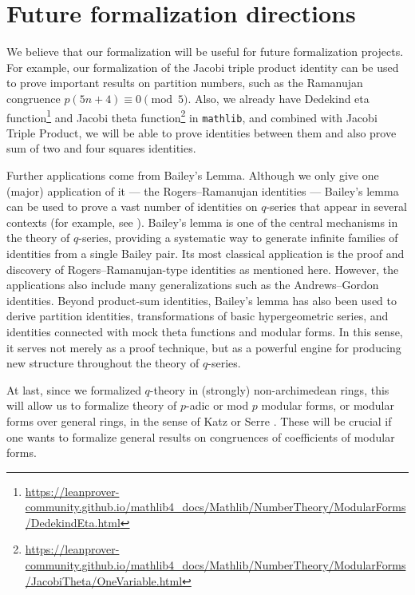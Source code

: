 \documentclass[12pt]{amsart}
\theoremstyle{definition}
\theoremstyle{remark}
\numberwithin{equation}{subsection}
\begin{document}
\section{Future formalization directions}

We believe that our formalization will be useful for future formalization projects.
For example, our formalization of the Jacobi triple product identity can be used to prove important results on partition numbers, such as the Ramanujan congruence $p(5n+4) \equiv 0 \pmod{5}$.
Also, we already have Dedekind eta function\footnote{\url{https://leanprover-community.github.io/mathlib4_docs/Mathlib/NumberTheory/ModularForms/DedekindEta.html}} and Jacobi theta function\footnote{\url{https://leanprover-community.github.io/mathlib4_docs/Mathlib/NumberTheory/ModularForms/JacobiTheta/OneVariable.html}} in \texttt{mathlib}, and combined with Jacobi Triple Product, we will be able to prove identities between them and also prove sum of two and four squares identities.

Further applications come from Bailey's Lemma. Although we only give one (major) application of it --- the Rogers--Ramanujan identities --- Bailey's lemma can be used to prove a vast number of identities on $q$-series that appear in several contexts (for example, see \cite{Andrews1974, Andrews1986, Bailey1949, Berndt, BFOR, GOW, SillsBook}). Bailey’s lemma is one of the central mechanisms in the theory of $q$-series, providing a systematic way to generate infinite families of identities from a single Bailey pair. Its most classical application is the proof and discovery of Rogers–Ramanujan-type identities as mentioned here. However, the applications also include many generalizations such as the Andrews–Gordon identities. Beyond product-sum identities, Bailey’s lemma has also been used to derive partition identities, transformations of basic hypergeometric series, and identities connected with mock theta functions and modular forms. In this sense, it serves not merely as a proof technique, but as a powerful engine for producing new structure throughout the theory of $q$-series.


At last, since we formalized $q$-theory in (strongly) non-archimedean rings, this will allow us to formalize theory of $p$-adic or mod $p$ modular forms, or modular forms over general rings, in the sense of Katz \cite{katz} or Serre \cite{serre}.
These will be crucial if one wants to formalize general results on congruences of coefficients of modular forms.
\end{document}
